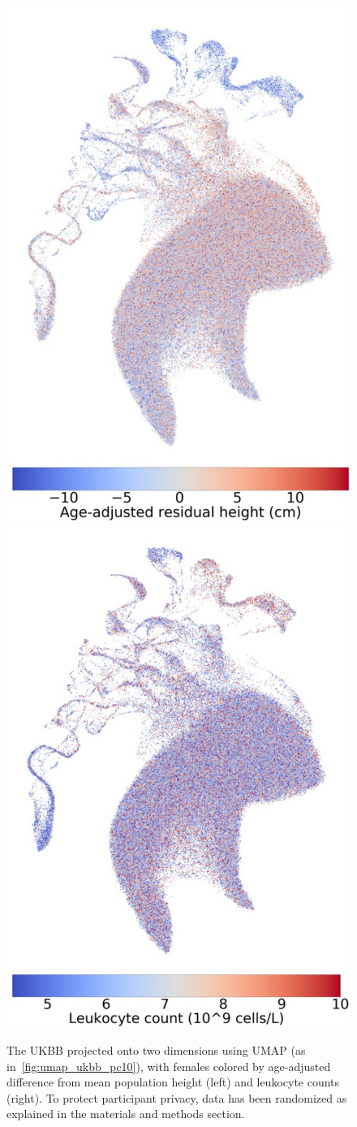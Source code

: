 \documentclass[12pt]{pnas-new}
\begin{document}
\begin{figure}
    \centering
    \includegraphics[width=0.4\columnwidth]{images/UKBB_UMAP_PC10_NN15_MD05_2018328174511_2018714161841_Height_res_pct1_f.pdf}
    \includegraphics[width=.4\columnwidth]{images/UKBB_UMAP_PC10_NN15_MD05_2018328174511_201871416519_leukocyte_count_pct5_f.pdf}
    \caption{The UKBB projected onto two dimensions using UMAP (as in~\ref{fig:umap_ukbb_pc10}), with females colored by age-adjusted difference from mean population height (left) and leukocyte counts (right). To protect participant privacy, data has been randomized as explained in the materials and methods section.}
    \label{fig:umap_height_female}
\end{figure}
\end{document}
